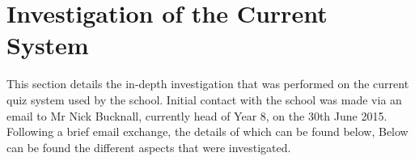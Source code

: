 \section{Investigation of the Current System}
This section details the in-depth investigation that was performed on the current quiz system used by the school. Initial contact with the school was made via an email to Mr Nick Bucknall, currently head of Year 8, on the 30th June 2015. Following a brief email exchange, the details of which can be found below, Below can be found the different aspects that were investigated.















